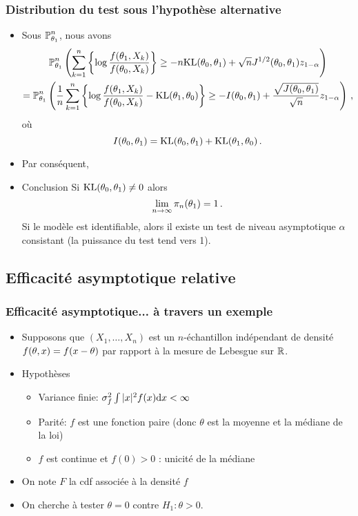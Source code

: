 \begin{frame}
\frametitle{Distribution du test sous l'hypothèse alternative}
\begin{itemize}
\item Sous $\operatorname{{\mathbb P}}^n_{\theta_1}$, nous avons
\begin{multline*}
\operatorname{{\mathbb P}}_{\theta_1}^n \left( \sum_{k=1}^n \left\{ \log \frac{f(\theta_1,X_k)}{f(\theta_0,X_k)}  \right\} \geq -n \mathrm{KL}(\theta_0,\theta_1) + \sqrt{n} J^{1/2}(\theta_0,\theta_1) z_{1-\alpha} \right) \\
=
\operatorname{{\mathbb P}}_{\theta_1}^n \left( \frac{1}{n} \sum_{k=1}^n \left\{ \log \frac{f(\theta_1,X_k)}{f(\theta_0,X_k)} - \mathrm{KL}(\theta_1,\theta_0) \right\} \geq - I(\theta_0,\theta_1) + \frac{\sqrt{J(\theta_0,\theta_1)}}{\sqrt{n}} z_{1-\alpha} \right) \,,
\end{multline*}
où
\[
I(\theta_0,\theta_1)= \mathrm{KL}(\theta_0,\theta_1) + \mathrm{KL}(\theta_1,\theta_0)  \,.
\]
\pause \item Par conséquent, \item \alert{Conclusion} Si $\mathrm{KL}(\theta_0,\theta_1) \ne 0$ alors
\[
\lim_{n \to \infty} \pi_n(\theta_1)= 1 \,.
\]
Si le modèle est identifiable, alors il existe un test de niveau asymptotique $\alpha$ consistant (la puissance du test tend  vers 1).
\end{itemize}
\end{frame}



\subsection{Efficacité asymptotique relative}
\begin{frame}
\frametitle{Efficacité asymptotique... à travers un exemple}
\begin{itemize}
\item Supposons que $(X_1,\dots,X_n)$ est un $n$-échantillon indépendant de densité $f(\theta,x)= f(x-\theta)$ par rapport à la mesure de Lebesgue sur $\mathbb{R}$.
\item \alert{Hypothèses}
\begin{itemize}
\item Variance finie: $\sigma^2_f \int |x|^2 f(x) \mathrm{d} x < \infty$
\item Parité: $f$ est une fonction paire (donc $\theta$ est la moyenne et la
  médiane de la loi)
\item $f$ est continue et $f(0) > 0$ : unicité de la médiane
\end{itemize}
\item On note $F$ la cdf associée à la densité $f$
\item On cherche à tester $\theta= 0$ contre $H_1: \theta > 0$.
\end{itemize}
\end{frame}


